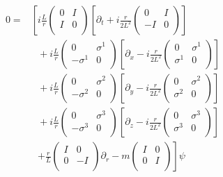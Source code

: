 \begin{align}
   0 =& \left[ i\frac{L}{r} \begin{pmatrix} 0 & I \\ I & 0 \\ \end{pmatrix} \left[ \partial_t + i\frac{r}{2L^2}\begin{pmatrix} 0 & I \\ -I & 0 \\ \end{pmatrix} \right] \right.\nonumber\\
      & ~~~ + i\frac{L}{r}\begin{pmatrix} 0 & \sigma^1 \\ -\sigma^1 & 0 \\ \end{pmatrix} \left[ \partial_x - i\frac{r}{2L^2}\begin{pmatrix} 0 & \sigma^1 \\ \sigma^1 & 0 \\ \end{pmatrix} \right] \nonumber\\
      & ~~~ + i\frac{L}{r}\begin{pmatrix} 0 & \sigma^2 \\ -\sigma^2 & 0 \\ \end{pmatrix} \left[ \partial_y - i\frac{r}{2L^2}\begin{pmatrix} 0 & \sigma^2 \\ \sigma^2 & 0 \\ \end{pmatrix} \right] \nonumber\\
      & ~~~ + i\frac{L}{r}\begin{pmatrix} 0 & \sigma^3 \\ -\sigma^3 & 0 \\ \end{pmatrix} \left[ \partial_z - i\frac{r}{2L^2}\begin{pmatrix} 0 & \sigma^3 \\ \sigma^3 & 0 \\ \end{pmatrix} \right] \nonumber\\
      & ~~~ \left. + \frac{r}{L}\begin{pmatrix} I & 0 \\ 0 & -I \\ \end{pmatrix} \partial_r - m \begin{pmatrix} I & 0 \\ 0 & I \\ \end{pmatrix} \right] \psi
\end{align}


